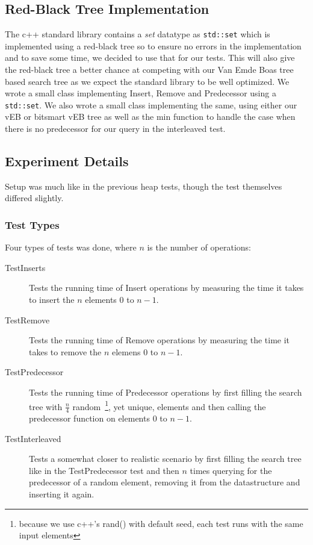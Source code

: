 \subsection{Red-Black Tree Implementation}
The c++ standard library contains a \textit{set} datatype as \texttt{std::set} which is implemented using a red-black tree so to ensure no errors in the implementation and to save some time, we decided to use that for our tests. This will also give the red-black tree a better chance at competing with our Van Emde Boas tree based search tree as we expect the standard library to be well optimized. We wrote a small class implementing Insert, Remove and Predecessor using a \texttt{std::set}. We also wrote a small class implementing the same, using either our vEB or bitsmart vEB tree as well as the min function to handle the case when there is no predecessor for our query in the interleaved test.

\subsection{Experiment Details}
Setup was much like in the previous heap tests, though the test themselves differed slightly.

\subsubsection{Test Types}
Four types of tests was done, where $n$ is the number of operations:
\begin{description}
\item[TestInserts] Tests the running time of Insert operations by measuring the time it takes to insert the $n$ elements $0$ to $n-1$.
\item[TestRemove] Tests the running time of Remove operations by measuring the time it takes to remove the $n$ elemens $0$ to $n-1$.
\item[TestPredecessor] Tests the running time of Predecessor operations by first filling the search tree with $\frac{n}{4}$ random~\footnote{because we use c++'s rand() with default seed, each test runs with the same input elements}, yet unique, elements and then calling the predecessor function on elements $0$ to $n-1$.
\item[TestInterleaved] Tests a somewhat closer to realistic scenario by first filling the search tree like in the TestPredecessor test and then $n$ times querying for the predecessor of a random element, removing it from the datastructure and inserting it again.
\end{description}

